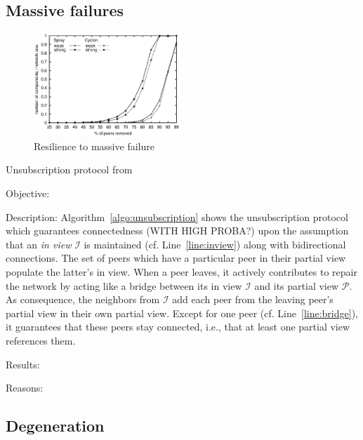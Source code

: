 \subsection{Massive failures}
\label{subsec:resilience}

\begin{figure}
  \centering
  \includegraphics[width=0.49\textwidth]{img/resilience.eps}
  \caption{\label{fig:resilience}Resilience to massive failure}
\end{figure}


\begin{algorithm}

\caption{\label{algo:unsubscription}Unsubscription protocol from
  \SCAMP{}~\cite{ganesh2003peer}}
\end{algorithm}

\begin{asparadesc}
\item[Objective:] 
\item[Description:] Algorithm~\ref{algo:unsubscription} shows the
  unsubscription protocol which guarantees connectedness (WITH HIGH PROBA?)
  upon the assumption that an \emph{in view} $\mathcal{I}$ is maintained
  (cf. Line~\ref{line:inview}) along with bidirectional connections. The set of
  peers which have a particular peer in their partial view populate the
  latter's in view. When a peer leaves, it actively contributes to repair the
  network by acting like a bridge between its in view $\mathcal{I}$ and its
  partial view $\mathcal{P}$. As consequence, the neighbors from $\mathcal{I}$
  add each peer from the leaving peer's partial view in their own partial view.
  Except for one peer (cf. Line~\ref{line:bridge}), it guarantees that these
  peers stay connected, i.e., that at least one partial view references them.

\item[Results:]
\item[Reasons:]
\end{asparadesc}

\subsection{Degeneration}


